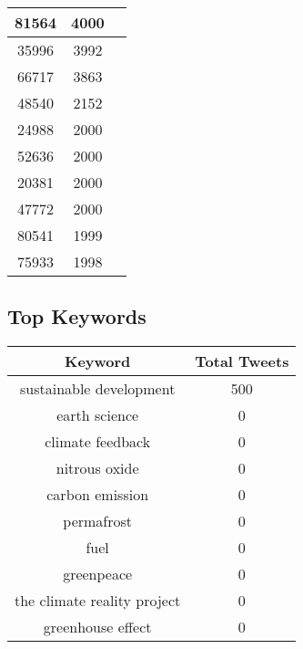 \documentclass{article}\usepackage[T1]{fontenc}
\begin{document}
\begin{tabular}{|c|c|c|}
 \hline
81564 & 4000\\ 
 \hline
35996 & 3992\\ 
 \hline
66717 & 3863\\ 
 \hline
48540 & 2152\\ 
 \hline
24988 & 2000\\ 
 \hline
52636 & 2000\\ 
 \hline
20381 & 2000\\ 
 \hline
47772 & 2000\\ 
 \hline
80541 & 1999\\ 
 \hline
75933 & 1998\\ 
 \hline
\end{tabular}\subsection*{Top Keywords}\begin{tabular}{|c|c|}         \hline         Keyword & Total Tweets \\ 
 \hline
sustainable development & 500\\ 
 \hline
earth science & 0\\ 
 \hline
climate feedback & 0\\ 
 \hline
nitrous oxide & 0\\ 
 \hline
carbon emission & 0\\ 
 \hline
permafrost & 0\\ 
 \hline
fuel & 0\\ 
 \hline
greenpeace & 0\\ 
 \hline
the climate reality project & 0\\ 
 \hline
greenhouse effect & 0\\ 
 \hline
\end{tabular}
\end{document}
